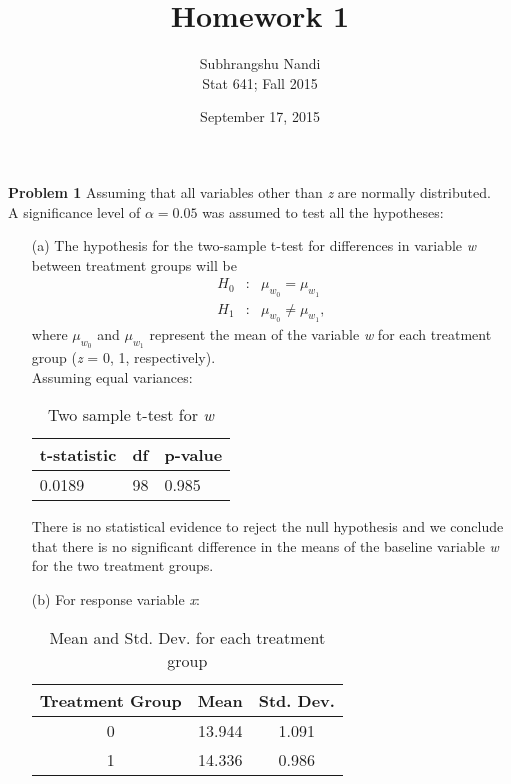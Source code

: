\documentclass[11pt,a4paper]{article}
\begin{document}
\title{Homework 1}
\author{Subhrangshu Nandi\\
  Stat 641; Fall 2015}
\date{September 17, 2015}

\maketitle

\noindent
\textbf{Problem 1} Assuming that all variables other than \emph{z} are normally distributed.\\
A significance level of $\alpha=0.05$ was assumed to test all the hypotheses:

\begin{enumerate}
\item[(a)]
The hypothesis for the two-sample t-test for differences in variable \emph{w} between treatment groups will be
\begin{eqnarray*}
  H_0 &:& \mu_{w_0} =\mu_{w_1}\\
  H_1 &:& \mu_{w_0} \neq \mu_{w_1},
\end{eqnarray*}
where $\mu_{w_0}$ and $\mu_{w_1}$ represent the mean of the variable \emph{w} for each treatment group (\emph{z} = 0, 1, respectively).\\
Assuming equal variances:
\begin{table}[h!]
\centering
\begin{tabular}{lll}
\hline
t-statistic & df & p-value\\
\hline
0.0189 & 98 & 0.985\\
\hline
\end{tabular}
\caption{Two sample t-test for \emph{w}}
\end{table}
There is no statistical evidence to reject the null hypothesis and we conclude that there is no significant difference 
in the means of the baseline variable \emph{w} for the two treatment groups.  

\item[(b)]
For response variable \emph{x}:
\begin{table}[h!]
\centering
\begin{tabular}{ccc}
\hline
Treatment Group & Mean & Std. Dev.\\
\hline
 0 &13.944&  1.091\\
 1 &14.336 & 0.986\\
\hline
\end{tabular}
\caption{Mean and Std. Dev. for each treatment group}
\end{table}


\end{enumerate}
\end{document}
